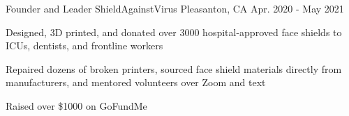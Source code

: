 \begin{cventries}






\cventry
{Founder and Leader} %
{ShieldAgainstVirus} %
{Pleasanton, CA} %
{Apr. 2020 - May 2021} %
{ %
\begin{cvitems}
\item {Designed, 3D printed, and donated over 3000 hospital-approved face shields to ICUs, dentists, and frontline workers}
\item {Repaired dozens of broken printers, sourced face shield materials directly from\\ manufacturers, and mentored volunteers over Zoom and text}
\item {Raised over \$1000 on GoFundMe}
\end{cvitems}
}









\end{cventries}

